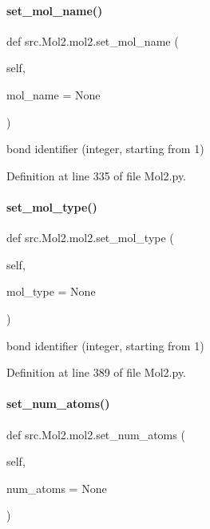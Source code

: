 \paragraph{\texorpdfstring{set\+\_\+mol\+\_\+name()}{set\_mol\_name()}}
{\footnotesize\ttfamily def src.\+Mol2.\+mol2.\+set\+\_\+mol\+\_\+name (\begin{DoxyParamCaption}\item[{}]{self,  }\item[{}]{mol\+\_\+name = {\ttfamily None} }\end{DoxyParamCaption})}



bond identifier (integer, starting from 1) 



Definition at line 335 of file Mol2.\+py.

\mbox{\label{classsrc_1_1Mol2_1_1mol2_a345314e47a25f20d1510489935b424d8}} 
\paragraph{\texorpdfstring{set\+\_\+mol\+\_\+type()}{set\_mol\_type()}}
{\footnotesize\ttfamily def src.\+Mol2.\+mol2.\+set\+\_\+mol\+\_\+type (\begin{DoxyParamCaption}\item[{}]{self,  }\item[{}]{mol\+\_\+type = {\ttfamily None} }\end{DoxyParamCaption})}



bond identifier (integer, starting from 1) 



Definition at line 389 of file Mol2.\+py.

\mbox{\label{classsrc_1_1Mol2_1_1mol2_a691b925e96c82a1dafb1e59fbf006bbf}} 
\paragraph{\texorpdfstring{set\+\_\+num\+\_\+atoms()}{set\_num\_atoms()}}
{\footnotesize\ttfamily def src.\+Mol2.\+mol2.\+set\+\_\+num\+\_\+atoms (\begin{DoxyParamCaption}\item[{}]{self,  }\item[{}]{num\+\_\+atoms = {\ttfamily None} }\end{DoxyParamCaption})}



